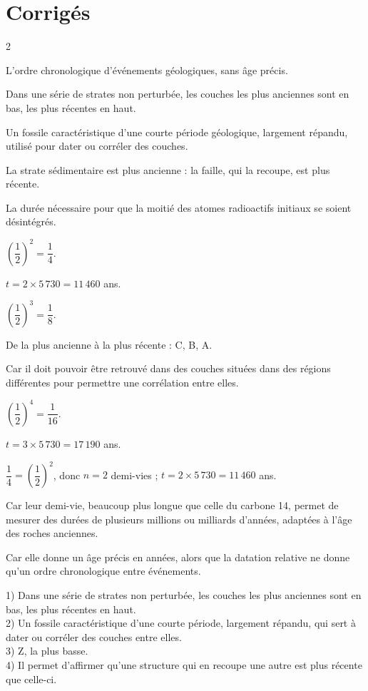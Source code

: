 \section{Corrigés}
\begin{multicols}{2}

L'ordre chronologique d'événements géologiques, sans âge précis.

Dans une série de strates non perturbée, les couches les plus anciennes sont en bas, les
plus récentes en haut.

Un fossile caractéristique d'une courte période géologique, largement répandu, utilisé
pour dater ou corréler des couches.

La strate sédimentaire est plus ancienne : la faille, qui la recoupe, est plus récente.

La durée nécessaire pour que la moitié des atomes radioactifs initiaux se soient
désintégrés.

$\left(\dfrac12\right)^2=\dfrac14$.

$t=2\times5\,730=11\,460$ ans.

$\left(\dfrac12\right)^3=\dfrac18$.

De la plus ancienne à la plus récente : C, B, A.

Car il doit pouvoir être retrouvé dans des couches situées dans des régions différentes
pour permettre une corrélation entre elles.

$\left(\dfrac12\right)^4=\dfrac1{16}$.

$t=3\times5\,730=17\,190$ ans.

$\dfrac14=\left(\dfrac12\right)^2$, donc $n=2$ demi-vies ; $t=2\times5\,730=11\,460$
ans.

Car leur demi-vie, beaucoup plus longue que celle du carbone 14, permet de mesurer des
durées de plusieurs millions ou milliards d'années, adaptées à l'âge des roches
anciennes.

Car elle donne un âge précis en années, alors que la datation relative ne donne qu'un
ordre chronologique entre événements.

1) Dans une série de strates non perturbée, les couches les plus anciennes sont en bas,
les plus récentes en haut.\\
2) Un fossile caractéristique d'une courte période, largement répandu, qui sert à dater
ou corréler des couches entre elles.\\
3) Z, la plus basse.\\
4) Il permet d'affirmer qu'une structure qui en recoupe une autre est plus récente que
celle-ci.


\end{multicols}
